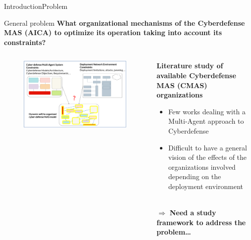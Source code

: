 \begin{frame}{Introduction}{Problem}

    \begin{alertblock}{General problem}
        \textbf{What organizational mechanisms of the Cyberdefense MAS (AICA) to optimize its operation taking into account its constraints?}
    \end{alertblock}

    \begin{columns}

        \begin{column}{0.6\textwidth}
            \begin{figure}
                \centering
                \includegraphics[width=0.95\linewidth]{figures/general_problem_illustration.png}
            \end{figure}
        \end{column}

        \begin{column}{0.5\textwidth}
            \textbf{Literature study of available Cyberdefense MAS (CMAS) organizations}

            \begin{itemize}
                \item Few works dealing with a Multi-Agent approach to Cyberdefense
                \item Difficult to have a general vision of the effects of the organizations involved depending on the deployment environment
            \end{itemize}

            \ \\

            $\Longrightarrow$ \textbf{Need a study framework to address the problem…}
        \end{column}
    \end{columns}

\end{frame}

